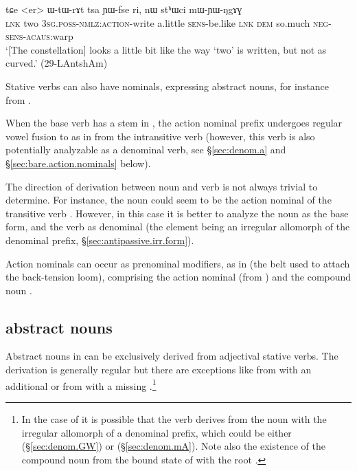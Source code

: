 \begin{exe}
\ex \label{ex:er.WtWrAt}
\gll  tɕe <er> ɯ-tɯ-rɤt tsa ɲɯ-fse ri, nɯ stʰɯci mɯ-ɲɯ-ŋgɤɣ \\
\textsc{lnk} two \textsc{3sg}.\textsc{poss}-\textsc{nmlz}:\textsc{action}-write a.little \textsc{sens}-be.like \textsc{lnk} \textsc{dem} so.much \textsc{neg}-\textsc{sens}-\textsc{acaus}:warp \\
\glt `[The constellation] looks a little bit like the way `two' is written, but not as curved.' (29-LAntshAm)
\end{exe} 
 
Stative verbs can also have  nominals, expressing abstract nouns, for instance  from .

When the base verb has a stem in , the action nominal prefix  undergoes regular vowel fusion  to  as in  from the intransitive verb  (however, this verb is also potentially analyzable as a  denominal verb, see §\ref{sec:denom.a} and §\ref{sec:bare.action.nominals} below).

The direction of derivation between noun and verb is not always trivial to determine. For instance, the noun  could seem to be the action nominal of the transitive verb . However, in this case it is better to analyze the noun as the base form, and the verb as denominal (the  element being an irregular allomorph of the  denominal prefix, §\ref{sec:antipassive.irr.form}).

Action nominals can occur as prenominal modifiers, as in  (the belt used to attach  the back-tension loom), comprising the action nominal  (from ) and the compound noun .

\subsection{ abstract nouns} \label{sec:tA.abstract.nouns}
Abstract nouns in  can be exclusively derived from adjectival stative verbs. The derivation is generally regular but there are exceptions like  from  with an additional  or   from  with a missing .\footnote{In the case of  it is possible that the verb  derives from the noun with the irregular allomorph of a denominal prefix, which could be either  (§\ref{sec:denom.GW}) or  (§\ref{sec:denom.mA}). Note also the existence of the compound noun  from the bound state of  with the root . }

